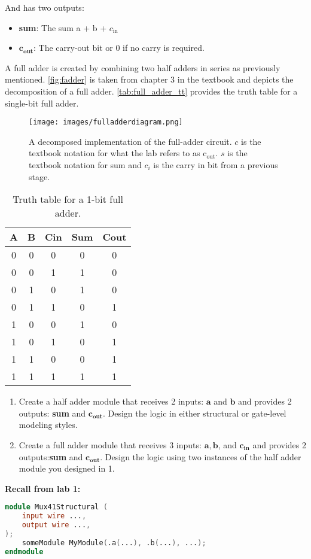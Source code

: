\documentclass[12pt]{betterjournal}
\begin{document}
And has two outputs:

\begin{itemize}
    \item \textbf{sum}: The sum a + b + $c_\text{in}$
    \item $\textbf{c}_\textbf{out}$: The carry-out bit or 0 if no carry is required.
\end{itemize}

A full adder is created by combining two half adders in series as previously mentioned. \autoref{fig:fadder} is taken from chapter 3 in the textbook and depicts the decomposition of a full adder. \autoref{tab:full_adder_tt} provides the truth table for a single-bit full adder.
\begin{figure}
    \centering
    \texttt{[image: images/fulladderdiagram.png]}
    \caption{A decomposed implementation of the full-adder circuit. $c$ is the textbook notation for what the lab refers to as $\text{c}_\text{out}$. $s$ is the textbook notation for sum and $c_i$ is the carry in bit from a previous stage.}
    \label{fig:fadder}
\end{figure}


\begin{table}[H]
    \centering
    \begin{tabular}{ccc|cc}
        \toprule
        A & B & Cin & Sum & Cout \\
        \midrule
        0 & 0 & 0 & 0 & 0 \\
        0 & 0 & 1 & 1 & 0 \\
        0 & 1 & 0 & 1 & 0 \\
        0 & 1 & 1 & 0 & 1 \\
        1 & 0 & 0 & 1 & 0 \\
        1 & 0 & 1 & 0 & 1 \\
        1 & 1 & 0 & 0 & 1 \\
        1 & 1 & 1 & 1 & 1 \\
        \bottomrule
    \end{tabular}
    \caption{Truth table for a 1-bit full adder.}
    \label{tab:full_adder_tt}
\end{table}
\clearpage
\begin{question}
\begin{enumerate}
    \item  Create a half adder module that receives 2 inputs: $\mathbf{a}$ and $\mathbf{b}$ and provides 2 outputs: \textbf{sum} and $\textbf{c}_\textbf{out}$. Design the logic in either structural or gate-level modeling styles.
    \item Create a full adder module that receives 3 inputs: $\mathbf{a},\mathbf{b}$, and $\textbf{c}_\textbf{in}$ and provides 2 outputs:\hspace{1em}\textbf{sum} and $\textbf{c}_\textbf{out}$. Design the logic using two instances of the half adder module you designed in 1.
\end{enumerate}
\end{question}
\noindent
\textbf{Recall from lab 1:}
\begin{lstlisting}[language=Verilog]
module Mux41Structural (
    input wire ...,
    output wire ..., 
);
    someModule MyModule(.a(...), .b(...), ...);
endmodule
\end{lstlisting}
\end{document}
